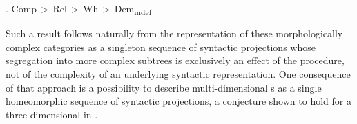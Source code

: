\ex. Comp\,$>$\,Rel\,$>$\,Wh\,$>$\,Dem\textsubscript{indef}

\noindent
Such a result follows naturally from the representation of these morphologically complex categories as a singleton sequence of syntactic projections whose segregation into more complex subtrees is exclusively an effect of the  procedure, not of the complexity of an underlying syntactic representation.
One consequence of that approach is a possibility to describe multi-dimensional s as a single homeomorphic sequence of syntactic projections, a conjecture shown to hold for a three-dimensional  in .



